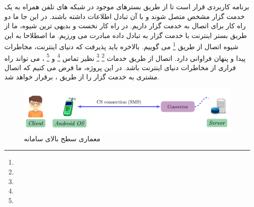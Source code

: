 \documentclass{report}
\begin{document}
   برنامه کاربردی
    قرار است تا از طریق بسترهای موجود در شبکه های تلفن همراه به یک خدمت گزار مشخص متصل شوند و با آن تبادل اطلاعات داشته باشند. در این جا ما دو راه کار برای اتصال به خدمت گزار داریم. در راه کار نخست و بدیهی ترین شیوه، ما از طریق بستر اینترنت با خدمت گزار به تبادل داده مبادرت می ورزیم. ما اصطلاحا به این شیوه اتصال از طریق 
    \footnote{}
     می گوییم. بالاخره باید پذیرفت که دنیای اینترنت، مخاطرات پیدا و پنهان فراوانی دارد. اتصال از طریق خدمات
     \footnote{} 
     \footnote{}     
     نظیر تماس
     \footnote{}
      و 
      \footnote{}
     ، می تواند راه فراری از مخاطرات دنیای اینترنت باشد. در این پروژه، ما فرض می کنیم که اتصال مشتری به خدمت گزار را از طریق
      ، برقرار خواهد شد.
      
     \begin{figure}[ht]
     	\centering
     	\includegraphics[width=\textwidth]{Pic/High_level_architecture}
     	\caption{معماری سطح بالای سامانه}
     	\label{fig:High_level_architecture}
     \end{figure} 
\end{document}
